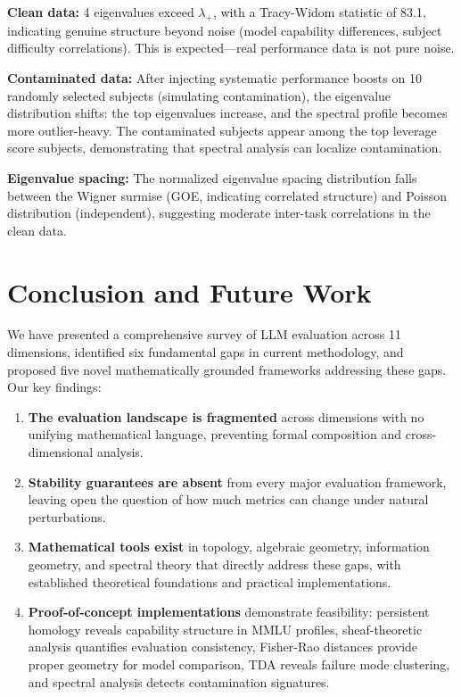 \documentclass[11pt]{article}
\begin{document}
\textbf{Clean data:} 4 eigenvalues exceed $\lambda_+$, with a Tracy-Widom statistic of 83.1, indicating genuine structure beyond noise (model capability differences, subject difficulty correlations). This is expected---real performance data is not pure noise.

\textbf{Contaminated data:} After injecting systematic performance boosts on 10 randomly selected subjects (simulating contamination), the eigenvalue distribution shifts: the top eigenvalues increase, and the spectral profile becomes more outlier-heavy. The contaminated subjects appear among the top leverage score subjects, demonstrating that spectral analysis can localize contamination.

\textbf{Eigenvalue spacing:} The normalized eigenvalue spacing distribution falls between the Wigner surmise (GOE, indicating correlated structure) and Poisson distribution (independent), suggesting moderate inter-task correlations in the clean data.



\section{Conclusion and Future Work}
\label{sec:conclusion}

We have presented a comprehensive survey of LLM evaluation across 11 dimensions, identified six fundamental gaps in current methodology, and proposed five novel mathematically grounded frameworks addressing these gaps. Our key findings:

\begin{enumerate}[leftmargin=*]
\item \textbf{The evaluation landscape is fragmented} across dimensions with no unifying mathematical language, preventing formal composition and cross-dimensional analysis.

\item \textbf{Stability guarantees are absent} from every major evaluation framework, leaving open the question of how much metrics can change under natural perturbations.

\item \textbf{Mathematical tools exist} in topology, algebraic geometry, information geometry, and spectral theory that directly address these gaps, with established theoretical foundations and practical implementations.

\item \textbf{Proof-of-concept implementations} demonstrate feasibility: persistent homology reveals capability structure in MMLU profiles, sheaf-theoretic analysis quantifies evaluation consistency, Fisher-Rao distances provide proper geometry for model comparison, TDA reveals failure mode clustering, and spectral analysis detects contamination signatures.
\end{enumerate}
\end{document}
